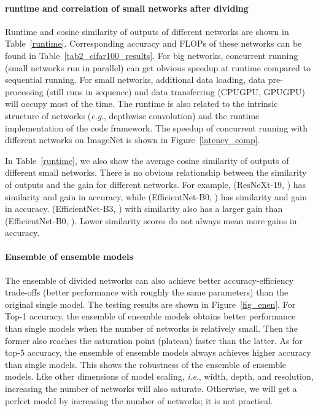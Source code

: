 \documentclass[lettersize,journal]{IEEEtran}
\newcommand{\ie}{\textit{i}.\textit{e}.}
\newcommand{\eg}{\textit{e}.\textit{g}.}
\begin{document}
\paragraph{runtime and correlation of small networks after dividing}
Runtime and cosine similarity of outputs of different networks
are shown in Table~\ref{runtime}.
Corresponding accuracy and FLOPs of these networks can be found in
Table~\ref{tab2_cifar100_results}.
For big networks, concurrent running (small networks run in parallel)
can get obvious speedup at runtime compared to sequential running.
For small networks, additional data loading, data pre-processing (still runs in sequence) and
data transferring (CPUGPU, GPUGPU) will occupy
most of the time. 
The runtime is also related to the intrinsic structure of networks (\eg, depthwise convolution)
and the runtime implementation of the code framework.
The speedup of concurrent running with different networks on ImageNet
is shown in Figure~\ref{latency_comp}.


In Table~\ref{runtime}, we also show the average cosine similarity of 
outputs of different small networks.
There is no obvious relationship
between the similarity of outputs and the gain for different networks.
For example, (ResNeXt-19, ) has similarity  and gain  in accuracy, while
(EfficientNet-B0, ) has similarity  and gain  in accuracy.
(EfficientNet-B3, ) with similarity  also has a larger gain 
than (EfficientNet-B0, ).
Lower similarity scores do not always mean more gains in accuracy.


\paragraph{Ensemble of ensemble models}
The ensemble of divided networks can also achieve better
accuracy-efficiency trade-offs (better performance with roughly the same parameters)
than the original single model.
The testing results are shown in Figure~\ref{fig_enen}.
For Top-1 accuracy, the ensemble of ensemble models obtains
better performance than single models when the number of
networks is relatively small. Then the former also reaches
the saturation point (plateau) faster than the latter.
As for top-5 accuracy, the ensemble of ensemble models
always achieves higher accuracy than single models.
This shows the robustness of the ensemble of ensemble models.
Like other dimensions of model scaling, \ie, width, depth, and resolution,
increasing the number of networks will also saturate.
Otherwise, we will get a perfect model by increasing the number of
networks; it is not practical.
\end{document}
